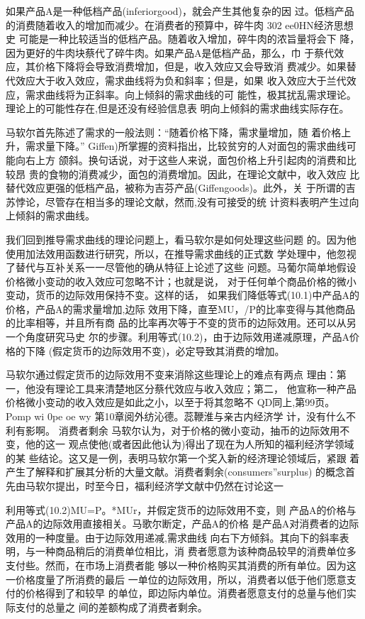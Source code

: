 如果产品A是一种低档产品(inferiorgood)，就会产生其他复杂的因
过。低档产品的消费随着收入的增加而减少。在消费者的预算中，碎牛肉
302
ee0HN经济思想史
可能是一种比较适当的低档产品。随着收入增加，碎牛肉的浓旨量将会下
降，因为更好的牛肉块蔡代了碎牛肉。如果产品A是低档产品，那么，巾
于蔡代效应，其价格下降将会导致消费增加，但是，收入效应又会导致消
费减少。如果替代效应大于收入效应，需求曲线将为负和斜率；但是，如果
收入效应大于兰代效应，需求曲线将为正斜率。向上倾斜的需求曲线的可
能性，极其扰乱需求理论。理论上的可能性存在,但是还没有经验信息表
明向上倾斜的需求曲线实际存在。

马软尔首先陈述了需求的一般法则：“随着价格下降，需求量增加，随
着价格上升，需求量下降。”%
Giffen)所掌握的资料指出，比较贫穷的人对面包的需求曲线可能向右上方
颌斜。换句话说，对于这些人来说，面包价格上升引起肉的消费和比较昂
贵的食物的消费减少，面包的消费增加。因此，在理论文献中，收入效应
比替代效应更强的低档产品，被称为吉芬产品(Giffengoods)。此外，关
于所谓的吉苏悖论，尽管存在相当多的理论文献，然而,没有可接受的统
计资料表明产生过向上倾斜的需求曲线。

我们回到推导需求曲线的理论问题上，看马软尔是如何处理这些问题
的。因为他使用加法效用函数进行研究，所以，在推导需求曲线的正式数
学处理中，他忽视了替代与互补关系一一尽管他的确从特征上论述了这些
问题。马葡尔简单地假设价格微小变动的收入效应可忽略不计；也就是说，
对于任何单个商品价格的微小变动，货币的边际效用保持不变。这样的话，
如果我们降低等式(10.1)中产品A的价格，产品A的需求量增加,边际
效用下降，直至MU，/P的比率变得与其他商品的比率相等，并且所有商
品的比率再次等于不变的货币的边际效用。还可以从另一个角度研究马史
尔的步骤。利用等式(10.2)，由于边际效用递减原理，产品A价格的下降
(假定货币的边际效用不变)，必定导致其消费的增加。

马软尔通过假定货币的边际效用不变来消除这些理论上的难点有两点
理由：第一，他没有理论工具来清楚地区分蔡代效应与收入效应；第二，
他宣称一种产品价格微小变动的收入效应是如此之小，以至于将其忽略不
QD同上,第99页。
Pomp
wi
0pe
oe
wy
第10章阅外纺沁德。蕊鞭淮与亲古内经济学
计，没有什么不利有影啊。
消费者剩余
马软尔认为，对于价格的微小变动，抽币的边际效用不变，他的这一
观点使他(或者因此他认为)得出了现在为人所知的福利经济学领域的某
些结论。这又是一例，表明马软尔第一个奖入新的经济理论领域后，紧跟
着产生了解释和扩展其分析的大量文献。消费者剩余(consumers”surplus)
的概念首先由马软尔提出，时至今日，福利经济学文献中仍然在讨论这一

利用等式(10.2)MU=P。*MUr，并假定货币的边际效用不变，则
产品A的价格与产品A的边际效用直接相关。马歌尔断定，产品A的价格
是产品A对消费者的边际效用的一种度量。由于边际效用递减,需求曲线
向右下方倾斜。其向下的斜率表明，与一种商品稍后的消费单位相比，消
费者愿意为该种商品较早的消费单位多支付些。然而，在市场上消费者能
够以一种价格购买其消费的所有单位。因为这一价格度量了所消费的最后
一单位的边际效用，所以，消费者以低于他们愿意支付的价格得到了和较早
的单位，即边际内单位。消费者愿意支付的总量与他们实际支付的总量之
间的差额构成了消费者剩余。

